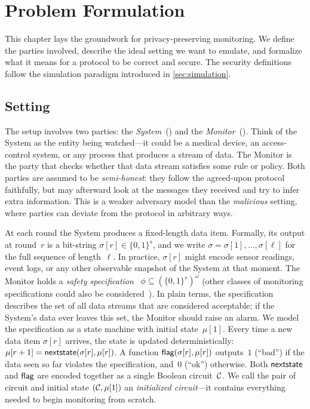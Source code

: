 \chapter{Problem Formulation}\label{ch:formulation}

This chapter lays the groundwork for privacy-preserving monitoring. We define the parties involved, describe the ideal setting we want to emulate, and formalize what it means for a protocol to be correct and secure. The security definitions follow the simulation paradigm introduced in \cref{sec:simulation}.

\section{Setting}\label{sec:setting}

The setup involves two parties: the \emph{System}~(\Pc) and the \emph{Monitor}~(\Mc). Think of the System as the entity being watched---it could be a medical device, an access-control system, or any process that produces a stream of data. The Monitor is the party that checks whether that data stream satisfies some rule or policy. Both parties are assumed to be \emph{semi-honest}: they follow the agreed-upon protocol faithfully, but may afterward look at the messages they received and try to infer extra information. This is a weaker adversary model than the \emph{malicious} setting, where parties can deviate from the protocol in arbitrary ways.

At each round the System produces a fixed-length data item. Formally, its output at round~$r$ is a bit-string $\sigma[r] \in \{0,1\}^s$, and we write $\sigma = \sigma[1],\dots,\sigma[\ell]$ for the full sequence of length~$\ell$. In practice, $\sigma[r]$ might encode sensor readings, event logs, or any other observable snapshot of the System at that moment. The Monitor holds a \emph{safety specification}~\cite{KKLSV02} $\phi \subseteq \left( {\{0,1\}^s} \right) ^\omega$ (other classes of monitoring specifications could also be considered~\cite{BFFR18}). In plain terms, the specification describes the set of all data streams that are considered acceptable; if the System's data ever leaves this set, the Monitor should raise an alarm. We model the specification as a state machine with initial state~$\mu[1]$. Every time a new data item $\sigma[r]$ arrives, the state is updated deterministically: $\mu[r+1] = \textsf{nextstate}(\sigma[r],\mu[r])$. A function $\textsf{flag}(\sigma[r],\mu[r])$ outputs~$1$ (``bad'') if the data seen so far violates the specification, and~$0$ (``ok'') otherwise. Both $\textsf{nextstate}$ and $\textsf{flag}$ are encoded together as a single Boolean circuit~$\mathcal{C}$. We call the pair of circuit and initial state $(\mathcal{C},\mu[1])$ an \emph{initialized circuit}---it contains everything needed to begin monitoring from scratch.

